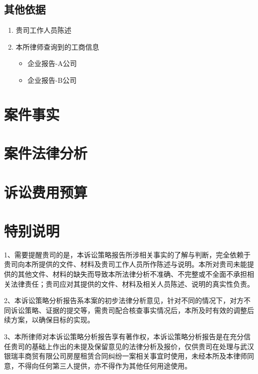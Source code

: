 \documentclass[fontset=none]{ctexart}
\begin{document}
	\subsection{其他依据} %
	\label{sub:其他依据}

	\begin{enumerate}
		\item 贵司工作人员陈述
		\item 本所律师查询到的工商信息
		\begin{itemize}
			\item 企业报告-A公司
			\item 企业报告-B公司
		\end{itemize}
	\end{enumerate}
	

	\section{案件事实} %
	\label{sec:案件事实}
	

	\section{案件法律分析} %
	\label{sec:案件法律分析}
	

	\section{诉讼费用预算} %
	\label{sec:诉讼费用预算}
	

	\section{特别说明} %
	\label{sec:特别说明}
	1、需要提醒贵司的是，本诉讼策略报告所涉相关事实的了解与判断，完全依赖于贵司向本所提供的文件、材料及贵司工作人员所作陈述与说明。本所对贵司未能提供的其他文件、材料的缺失而导致本所法律分析不准确、不完整或不全面不承担相关法律责任；贵司应对其提供的文件、材料及相关人员陈述、说明的真实性负责。

	2、本诉讼策略分析报告系本案的初步法律分析意见，针对不同的情况下，对方不同诉讼策略、证据的提交等，需贵司配合核查事实情况后，本所及时有效的调整后续方案，以确保目标的实现。

	3、本所律师对本诉讼策略分析报告享有著作权，本诉讼策略分析报告是在充分信任贵司的基础上作出的未提及保留意见的法律分析及报价，仅供贵司在处理与武汉银瑞丰商贸有限公司房屋租赁合同纠纷一案相关事宜时使用，未经本所及本律师同意，不得向任何第三人提供，亦不得作为其他任何用途使用。




	\vspace*{5em}
	
	\hfill {}\\
	\vspace{1.5ex}
	\hfill \makebox[10em][c]{\today}
	
\end{document}
